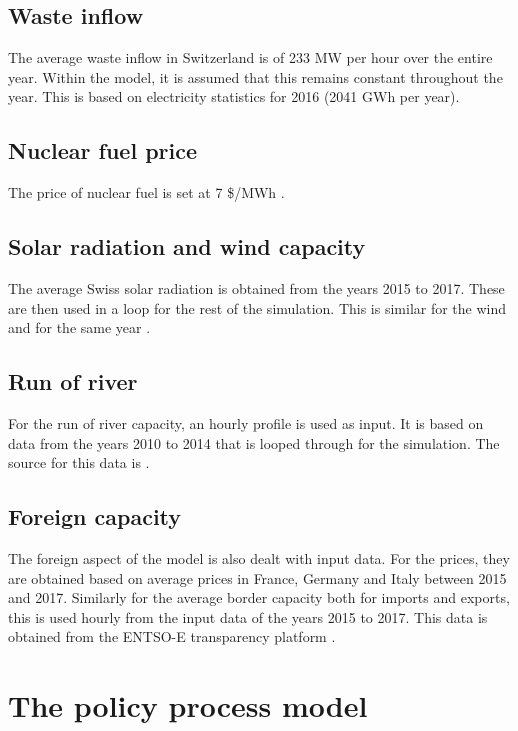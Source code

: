 \subsection{Waste inflow}

The average waste inflow in Switzerland is of 233 MW per hour over the entire year. Within the model, it is assumed that this remains constant throughout the year. This is based on electricity statistics for 2016 (2041 GWh per year).


\subsection{Nuclear fuel price}

The price of nuclear fuel is set at 7 \$/MWh \citep{NREL2018annual}.


\subsection{Solar radiation and wind capacity}

The average Swiss solar radiation is obtained from the years 2015 to 2017. These are then used in a loop for the rest of the simulation. This is similar for the wind and for the same year \citep{sfoe2018Elektrizitatsstatistik}.


\subsection{Run of river}

For the run of river capacity, an hourly profile is used as input. It is based on data from the years 2010 to 2014 that is looped through for the simulation. The source for this data is \cite{demiray2018Modellierung}.


\subsection{Foreign capacity}

The foreign aspect of the model is also dealt with input data. For the prices, they are obtained based on average prices in France, Germany and Italy between 2015 and 2017. Similarly for the average border capacity both for imports and exports, this is used hourly from the input data of the years 2015 to 2017. This data is obtained from the ENTSO-E transparency platform \citep{ENTSO2018transparency}.



\section{The policy process model}
\label{sec:InputsPolicy}



